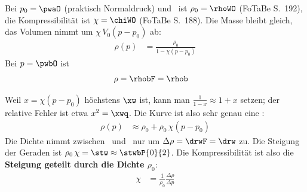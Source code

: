 Bei $p_0 = \pwaO$ (praktisch Normaldruck) und \TwO\ ist $\rho_0 = \rhoWO$ (FoTaBe S.~192), die Kompressibilität ist $\chi = \chiWO$ (FoTaBe S.~188). Die Masse bleibt gleich, das Volumen nimmt um $\chi\,V_0\left(p-p_0\right)$ ab:
\begin{align}
 \rho(p) &= \frac{\rho_0}{1-\chi\left(p-p_0\right)}
\end{align}
Bei $p = \pwbO$ ist
\begin{align}
 \rho &= \rhobF = \rhob
\end{align}
\begin{center}
\end{center}
Weil $x = \chi\left(p-p_0\right)$ höchstens $\xw$ ist, kann man $\frac{1}{1-x}\approx 1+x$ setzen; der relative Fehler ist etwa $x^2 = \xwq$. Die Kurve ist also sehr genau eine :
\begin{align}
 \rho(p) &\approx \rho_0 + \rho_0\,\chi\left(p-p_0\right)
\end{align}
Die Dichte nimmt zwischen \pwaO\ und \pwbO\ nur um $\Delta\rho = \drwF = \drw$ zu. Die Steigung der Geraden ist $\rho_0\,\chi = \stw \approx \stwbP{0}{2}$. Die Kompressibilität ist also die \textbf{Steigung geteilt durch die Dichte $\rho_0$}:
\begin{align}
 \chi &= \frac{1}{\rho_0}\frac{\Delta\rho}{\Delta p}
\end{align}

